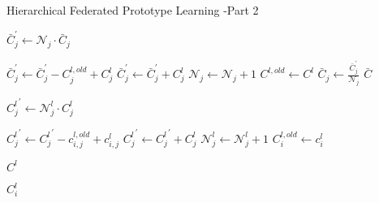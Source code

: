 \documentclass{article}
\begin{document}
\begin{algorithm}
    \caption{Hierarchical Federated Prototype Learning -Part 2}
    \begin{algorithmic}[1]
        \State \( \bar{C}_{j}^{'} \gets \mathcal{N}_j \cdot\bar{C}_{j} \) 
        \EndFor

        \State \( \bar{C}_{j}^{'}  \gets \bar{C}_{j}^{'} -C^{l,old}_j + C^l_j \)
        \Else
        \State \( \bar{C}_{j}^{'}  \gets \bar{C}_{j}^{'} +C^l_j \)
        \State \( \mathcal{N}_j \gets \mathcal{N}_j + 1 \)
        \EndIf
        \State \( C^{l,old} \gets C^l \)
        \EndFor
        \EndFor
        \State \( \bar{C}_{j} \gets \frac{\bar{C}_{j}^{'}}{\mathcal{N}_j} \)
        \State \Return \( \bar{C} \)
        \EndProcedure

        \State \( {C^l_j}^{'} \gets \mathcal{N}^l_j \cdot C^l_{j} \)
        \EndFor

        \State \( {C^l_j}^{'}  \gets {C^l_j}^{'} - c^{l,old}_{i,j} + c^l_{i,j} \)
        \Else
        \State \( {C^l_j}^{'}  \gets {C^l_j}^{'} +C^l_j \)
        \State \( \mathcal{N}_j^l \gets \mathcal{N}_j^l + 1 \)
        \EndIf
        \State \( C^{l, old}_i \gets c^l_i \)
        \EndFor
        \EndFor

        \Return \( C^l \)
        \EndProcedure

        \State \Return \( C^l_i \)
        \EndProcedure
    \end{algorithmic}
\end{algorithm}



\end{document}

